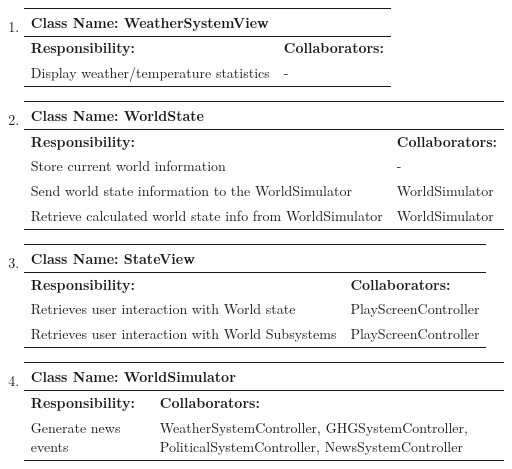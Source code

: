 \documentclass[]{article}
\begin{document}
\begin{enumerate}[1.]
\begin{tabular}{|p{10cm}|p{4cm}|}
	    \hline
	  \end{tabular}

	\item
	\begin{tabular}{|p{10cm}|p{4cm}|}
	    \hline
	     \multicolumn{2}{|l|}{\textbf{Class Name:  WeatherSystemView}} \\
	    \hline
	    \textbf{Responsibility:} & \textbf{Collaborators:} \\
	    \hline
	    Display weather/temperature statistics & - \\

	    \hline
	  \end{tabular}

	\item
	\begin{tabular}{|p{10cm}|p{4cm}|}
	    \hline
	     \multicolumn{2}{|l|}{\textbf{Class Name:  WorldState}} \\
	    \hline
	    \textbf{Responsibility:} & \textbf{Collaborators:} \\
	    \hline
	    Store current world information & - \\
	Send world state information to the WorldSimulator & WorldSimulator \\
	Retrieve calculated world state info from WorldSimulator & WorldSimulator \\

	    \hline
	  \end{tabular}

	\item
	\begin{tabular}{|p{10cm}|p{4cm}|}
	    \hline
	     \multicolumn{2}{|l|}{\textbf{Class Name:  StateView}} \\
	    \hline
	    \textbf{Responsibility:} & \textbf{Collaborators:} \\
	    \hline
	    Retrieves user interaction with World state & PlayScreenController \\
	Retrieves user interaction with World Subsystems & PlayScreenController \\

	    \hline
	  \end{tabular}

	\item
	\begin{tabular}{|p{10cm}|p{4cm}|}
	    \hline
	     \multicolumn{2}{|l|}{\textbf{Class Name:  WorldSimulator}} \\
	    \hline
	    \textbf{Responsibility:} & \textbf{Collaborators:} \\
	    \hline
	    Generate news events & WeatherSystemController, GHGSystemController, PoliticalSystemController, NewsSystemController \\


\end{tabular}
\end{enumerate}
\end{document}
